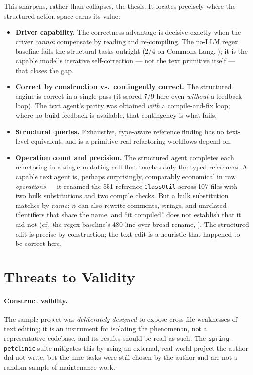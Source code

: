 This sharpens, rather than collapses, the thesis. It locates precisely where the
structured action space earns its value:
\begin{itemize}
  \item \textbf{Driver capability.} The correctness advantage is decisive exactly when
  the driver \emph{cannot} compensate by reading and re-compiling. The no-LLM regex
  baseline fails the structural tasks outright (2/4 on Commons Lang,
  ); it is the capable model's iterative self-correction --- not the
  text primitive itself --- that closes the gap.
  \item \textbf{Correct by construction vs.\ contingently correct.} The structured
  engine is correct in a single pass (it scored 7/9 here even \emph{without} a feedback
  loop). The text agent's parity was obtained \emph{with} a compile-and-fix loop;
  where no build feedback is available, that contingency is what fails.
  \item \textbf{Structural queries.} Exhaustive, type-aware reference finding has no
  text-level equivalent, and is a primitive real refactoring workflows depend on.
  \item \textbf{Operation count and precision.} The structured agent completes each
  refactoring in a single mutating call that touches only the typed references. A
  capable text agent is, perhaps surprisingly, comparably economical in raw
  \emph{operations} --- it renamed the 551-reference \texttt{ClassUtil} across 107
  files with two bulk substitutions and two compile checks. But a bulk substitution
  matches by \emph{name}: it can also rewrite comments, strings, and unrelated
  identifiers that share the name, and ``it compiled'' does not establish that it did
  not (cf.\ the regex baseline's 480-line over-broad rename, ). The
  structured edit is precise by construction; the text edit is a heuristic that
  happened to be correct here.
\end{itemize}

\section{Threats to Validity}
\label{sec:eval-threats}
\paragraph{Construct validity.} The sample project was \emph{deliberately designed}
to expose cross-file weaknesses of text editing; it is an instrument for isolating
the phenomenon, not a representative codebase, and its results should be read as
such. The \texttt{spring-petclinic} suite mitigates this by using an external,
real-world project the author did not write, but the nine tasks were still chosen
by the author and are not a random sample of maintenance work.

